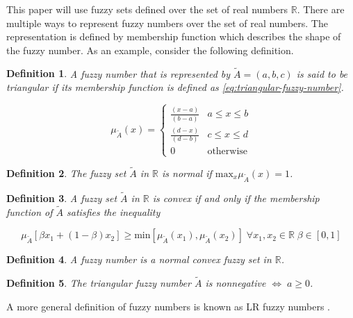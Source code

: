 \documentclass[ee,msthesis]{usuthesis}
\newtheorem{definition}{Definition}[section]
\begin{document}
This paper will use fuzzy sets defined over the set of real numbers \(\mathbb{R}\). There are multiple ways to represent fuzzy
numbers over the set of real numbers. The representation is defined by membership function which describes the shape of
the fuzzy number. As an example, consider the following definition.

\begin{definition}
A fuzzy number that is represented by \(\tilde{A} = (a,b,c)\) is said to be triangular if its membership function is
defined as \ref{eq:triangular-fuzzy-number}.

\begin{equation}
\label{eq:triangular-fuzzy-number}
  \mu_{\tilde{A}}(x) =
  \begin{cases}
    \frac{(x-a)}{(b-a)} & a \le x \le b \\
    \frac{(d-x)}{(d-b)} & c \le x \le d \\
    0                   & \text{otherwise}
  \end{cases}
\end{equation}
\end{definition}

\begin{definition}
The fuzzy set \(\tilde{A}\) in \(\mathbb{R}\) is normal if \(\text{max}_x \mu_{\tilde{A}}(x) = 1\).
\end{definition}

\begin{definition}
A fuzzy set \(\tilde{A}\) in \(\mathbb{R}\) is convex if and only if the membership function of \(\tilde{A}\) satisfies the inequality

\begin{equation*}
\mu_{\tilde{A}}[\beta x_1 + (1-\beta)x_2] \ge \text{min}[\mu_{\tilde{A}}(x_1), \mu_{\tilde{A}}(x_2)]\; \forall x_1, x_2 \in \mathbb{R}\; \beta \in [0,1]
\end{equation*}
\end{definition}

\begin{definition}
A fuzzy number is a normal convex fuzzy set in \(\mathbb{R}\).
\end{definition}

\begin{definition}
The triangular fuzzy number \(\tilde{A}\) is nonnegative \(\iff\; a \ge 0\).
\end{definition}

A more general definition of fuzzy numbers is known as LR fuzzy numbers
\cite{kaur-2016-introd-fuzzy,zimmermann-2001-fuzzy-set}.
\end{document}
